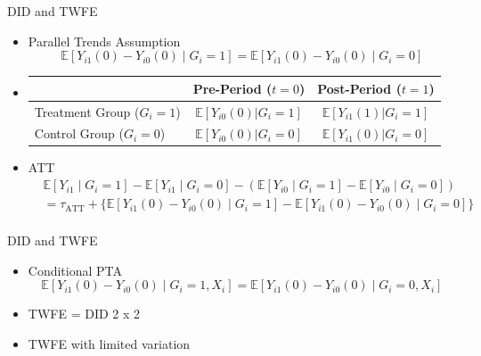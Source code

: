 \documentclass[handout]{beamer}
\begin{document}
\begin{frame}{DID and TWFE}
    \begin{itemize}
        \item Parallel Trends Assumption
            $$
            \mathbb{E}[Y_{i1}(0) - Y_{i0}(0) \mid G_i = 1] = \mathbb{E}[Y_{i1}(0) - Y_{i0}(0) \mid G_i = 0]
            $$ 
        \item 
            \begin{tabular}{l|c|c}
                \toprule
                & Pre-Period ($t=0$) & Post-Period ($t=1$) \\
                \midrule
                Treatment Group ($G_i = 1$) & $\mathbb{E}[Y_{i0}(0)|G_i = 1]$ & $\mathbb{E}[Y_{i1}(1)|G_i = 1]$ \\
                Control Group ($G_i = 0$)   & $\mathbb{E}[Y_{i0}(0)|G_i = 0]$ & $\mathbb{E}[Y_{i1}(0)|G_i = 0]$ \\
                \bottomrule
            \end{tabular}
        \item ATT
            $$
            \begin{aligned}
                & \mathbb{E}[Y_{i1} \mid G_i = 1] - \mathbb{E}[Y_{i1} \mid G_i = 0] - (\mathbb{E}[Y_{i0} \mid G_i = 1] - \mathbb{E}[Y_{i0} \mid G_i = 0]) \\
                &= \tau_{\text{ATT}} + \{ \mathbb{E}[Y_{i1}(0) - Y_{i0}(0) \mid G_i = 1] - \mathbb{E}[Y_{i1}(0) - Y_{i0}(0) \mid G_i = 0] \}\\
            \end{aligned}
            $$
    \end{itemize}
\end{frame}

\begin{frame}{DID and TWFE}
\begin{itemize}
    \item Conditional PTA
            $$
            \mathbb{E}[Y_{i1}(0) - Y_{i0}(0) \mid G_i = 1, X_i] = \mathbb{E}[Y_{i1}(0) - Y_{i0}(0) \mid G_i = 0, X_i]
            $$ 
    \item TWFE = DID 2 x 2
    \item TWFE with limited variation
\end{itemize}
\end{frame}
\end{document}

